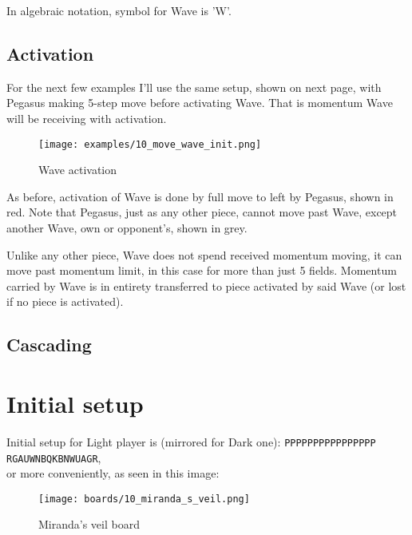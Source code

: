 In algebraic notation, symbol for Wave is 'W'.

\subsection*{Activation}

For the next few examples I'll use the same setup, shown on next
page, with Pegasus making 5-step move before activating Wave. That
is momentum Wave will be receiving with activation.

\clearpage %

\noindent
\begin{figure}[h]
\texttt{[image: examples/10\_move\_wave\_init.png]}
\caption{Wave activation}
\label{fig:wave_activation}
\end{figure}

As before, activation of Wave is done by full move to left by Pegasus,
shown in red. Note that Pegasus, just as any other piece, cannot move
past Wave, except another Wave, own or opponent's, shown in grey.

\clearpage %

Unlike any
other piece, Wave does not spend received momentum moving, it can
move past momentum limit, in this case for more than just 5 fields.
Momentum carried by Wave is in entirety transferred to piece
activated by said Wave (or lost if no piece is activated).

\clearpage %

\subsection*{Cascading}

\clearpage %

\section*{Initial setup}

Initial setup for Light player is (mirrored for Dark one):
\texttt{PPPPPPPPPPPPPPPP \\
        RGAUWNBQKBNWUAGR}, \\
or more conveniently, as seen in this image:

\noindent
\begin{figure}[h]
\texttt{[image: boards/10\_miranda\_s\_veil.png]}
\caption{Miranda's veil board}
\label{fig:miranda_s_veil}
\end{figure}

\clearpage %
